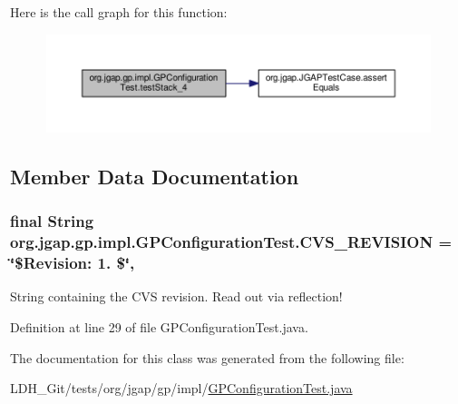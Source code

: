 Here is the call graph for this function\-:
\nopagebreak
\begin{figure}[H]
\begin{center}
\leavevmode
\includegraphics[width=350pt]{classorg_1_1jgap_1_1gp_1_1impl_1_1_g_p_configuration_test_a2cf53bda9b5b8a48247157a67c6c8744_cgraph}
\end{center}
\end{figure}




\subsection{Member Data Documentation}
\hypertarget{classorg_1_1jgap_1_1gp_1_1impl_1_1_g_p_configuration_test_ab1dd3b005cb271b8795efcfe58336d39}{
\subsubsection[{C\-V\-S\-\_\-\-R\-E\-V\-I\-S\-I\-O\-N}]{\setlength{\rightskip}{0pt plus 5cm}final String org.\-jgap.\-gp.\-impl.\-G\-P\-Configuration\-Test.\-C\-V\-S\-\_\-\-R\-E\-V\-I\-S\-I\-O\-N = \char`\"{}\$Revision\-: 1. \$\char`\"{}\hspace{0.3cm}{\ttfamily [static]}, {\ttfamily [private]}}}\label{classorg_1_1jgap_1_1gp_1_1impl_1_1_g_p_configuration_test_ab1dd3b005cb271b8795efcfe58336d39}
String containing the C\-V\-S revision. Read out via reflection! 

Definition at line 29 of file G\-P\-Configuration\-Test.\-java.



The documentation for this class was generated from the following file\-:\begin{DoxyCompactItemize}
\item 
L\-D\-H\-\_\-\-Git/tests/org/jgap/gp/impl/\hyperlink{_g_p_configuration_test_8java}{G\-P\-Configuration\-Test.\-java}\end{DoxyCompactItemize}
